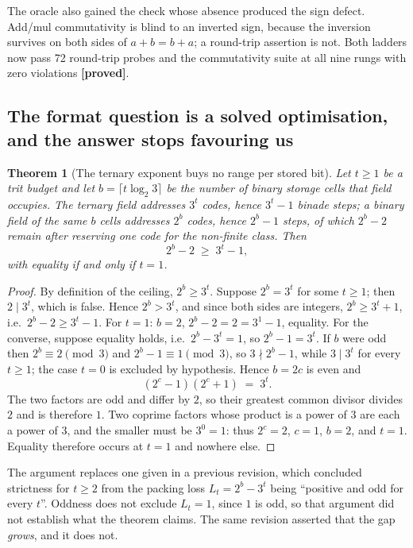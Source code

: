 \documentclass[11pt]{article}
\newtheorem{theorem}{Theorem}
\theoremstyle{definition}
\begin{document}
The oracle also gained the check whose absence produced the sign defect. Add/mul
commutativity is blind to an inverted sign, because the inversion survives on both
sides of $a+b=b+a$; a round-trip assertion is not. Both ladders now pass 72
round-trip probes and the commutativity suite at all nine rungs with zero
violations \textbf{[proved]}.

\subsection{The format question is a solved optimisation, and the answer stops favouring us}
\label{sec:variantB}

\begin{theorem}[The ternary exponent buys no range per stored bit]
\label{thm:rangeperbit}
Let $t \ge 1$ be a trit budget and let $b = \lceil t\log_2 3\rceil$ be the number
of binary storage cells that field occupies. The ternary field addresses $3^t$
codes, hence $3^t - 1$ binade steps; a binary field of the same $b$ cells
addresses $2^b$ codes, hence $2^b - 1$ steps, of which $2^b - 2$ remain after
reserving one code for the non-finite class. Then
\[
2^b - 2 \;\ge\; 3^t - 1,
\]
with equality if and only if $t = 1$.
\end{theorem}

\begin{proof}
By definition of the ceiling, $2^b \ge 3^t$. Suppose $2^b = 3^t$ for some
$t \ge 1$; then $2 \mid 3^t$, which is false. Hence $2^b > 3^t$, and since both
sides are integers, $2^b \ge 3^t + 1$, i.e.\ $2^b - 2 \ge 3^t - 1$. For $t = 1$:
$b = 2$, $2^b - 2 = 2 = 3^1 - 1$, equality. For the converse, suppose equality
holds, i.e.\ $2^b - 3^t = 1$, so $2^b - 1 = 3^t$. If $b$ were odd then
$2^b \equiv 2 \pmod 3$ and $2^b - 1 \equiv 1 \pmod 3$, so $3 \nmid 2^{b}-1$, while
$3 \mid 3^{t}$ for every $t \ge 1$; the case $t = 0$ is excluded by hypothesis. Hence $b = 2c$ is even and
\[
  (2^{c}-1)(2^{c}+1) \;=\; 3^{t}.
\]
The two factors are odd and differ by $2$, so their greatest common divisor
divides $2$ and is therefore $1$. Two coprime factors whose product is a power of
$3$ are each a power of $3$, and the smaller must be $3^0 = 1$: thus $2^{c} = 2$,
$c = 1$, $b = 2$, and $t = 1$. Equality therefore occurs at $t = 1$ and nowhere
else.
\end{proof}

The argument replaces one given in a previous revision, which concluded strictness
for $t \ge 2$ from the packing loss $L_t = 2^{b} - 3^{t}$ being ``positive and odd
for every $t$''. Oddness does not exclude $L_t = 1$, since $1$ is odd, so that
argument did not establish what the theorem claims. The same revision asserted
that the gap \emph{grows}, and it does not.
\end{document}
